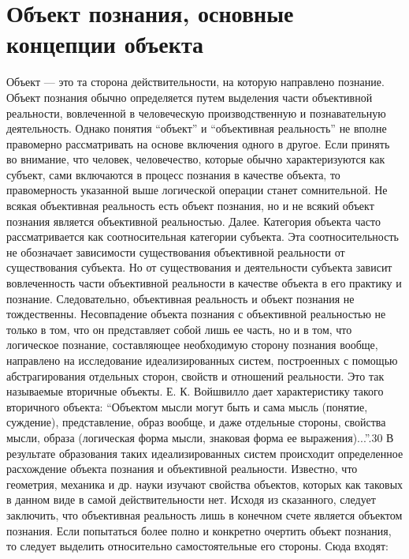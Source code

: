 \documentclass[12pt]{article}
\begin{document}
\section{Объект познания, основные концепции объекта}
Объект — это та сторона действительности, на которую направлено познание.
Объект  познания  обычно  определяется  путем  выделения  части  объективной  реальности,  вовлеченной  в
человеческую производственную и познавательную деятельность. Однако понятия “объект” и “объективная
реальность” не вполне правомерно рассматривать на основе включения одного в другое. Если принять во
внимание,  что  человек,  человечество,  которые  обычно  характеризуются  как  субъект,  сами  включаются  в
процесс  познания  в  качестве  объекта,  то  правомерность  указанной  выше  логической  операции  станет
сомнительной.  Не  всякая  объективная  реальность  есть  объект  познания,  но  и  не  всякий  объект  познания
является объективной реальностью.
Далее.  Категория  объекта  часто  рассматривается  как  соотносительная  категории  субъекта.  Эта
соотносительность  не  обозначает  зависимости  существования  объективной  реальности  от  существования
субъекта. Но от существования и деятельности субъекта зависит вовлеченность части объективной реальности в
качестве объекта в его практику и познание. Следовательно, объективная реальность и объект познания не
тождественны.
Несовпадение объекта познания с объективной реальностью не только в том, что он представляет собой лишь
ее  часть,  но  и  в  том,  что  логическое  познание,  составляющее  необходимую  сторону  познания  вообще,
направлено на исследование идеализированных систем, построенных с помощью абстрагирования отдельных
сторон, свойств и отношений реальности. Это так называемые вторичные объекты. Е. К. Войшвилло дает
характеристику такого вторичного объекта: “Объектом мысли могут быть и сама мысль (понятие, суждение),
представление, образ вообще, и даже отдельные стороны, свойства мысли, образа (логическая форма мысли,
знаковая форма ее выражения)...”.30 В результате образования таких идеализированных систем происходит
определенное расхождение объекта познания и объективной реальности. Известно, что геометрия, механика и
др. науки изучают свойства объектов, которых как таковых в данном виде в самой действительности нет.
Исходя  из  сказанного,  следует  заключить,  что  объективная  реальность  лишь  в  конечном  счете  является
объектом познания. Если попытаться более полно и конкретно очертить объект познания, то следует выделить
относительно самостоятельные его стороны. Сюда входят:
\end{document}
